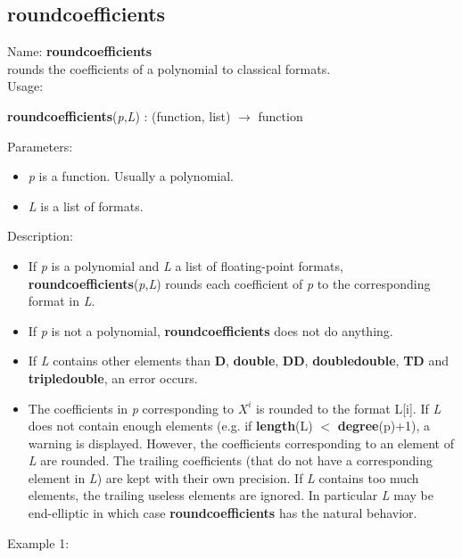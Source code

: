 \subsection{roundcoefficients}
\label{labroundcoefficients}
\noindent Name: \textbf{roundcoefficients}\\
rounds the coefficients of a polynomial to classical formats.\\
\noindent Usage: 
\begin{center}
\textbf{roundcoefficients}(\emph{p},\emph{L}) : (\textsf{function}, \textsf{list}) $\rightarrow$ \textsf{function}
\\ 
\end{center}
Parameters: 
\begin{itemize}
\item \emph{p} is a function. Usually a polynomial.
\item \emph{L} is a list of formats.
\end{itemize}
\noindent Description: \begin{itemize}

\item If \emph{p} is a polynomial and \emph{L} a list of floating-point formats, 
   \textbf{roundcoefficients}(\emph{p},\emph{L}) rounds each coefficient of \emph{p} to the corresponding format
   in \emph{L}.

\item If \emph{p} is not a polynomial, \textbf{roundcoefficients} does not do anything.

\item If \emph{L} contains other elements than \textbf{D}, \textbf{double}, \textbf{DD}, \textbf{doubledouble}, \textbf{TD} and
   \textbf{tripledouble}, an error occurs.

\item The coefficients in \emph{p} corresponding to $X^i$ is rounded to the 
   format L[i]. If \emph{L} does not contain enough elements
   (e.g. if \textbf{length}(L) $<$ \textbf{degree}(p)+1), a warning is displayed. However, the
   coefficients corresponding to an element of \emph{L} are rounded. The trailing 
   coefficients (that do not have a corresponding element in \emph{L}) are kept with
   their own precision.
   If \emph{L} contains too much elements, the trailing useless elements are ignored.
   In particular \emph{L} may be end-elliptic in which case \textbf{roundcoefficients} has the 
   natural behavior.
\end{itemize}
\noindent Example 1: 
